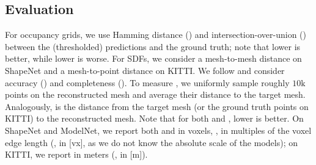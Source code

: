 \subsection{Evaluation}
\label{sec:evaluation}

For occupancy grids, we use Hamming distance (\Abs) and intersection-over-union (\IoU) between the (thresholded) predictions and the ground truth; note that lower \Abs is better, while lower \IoU is worse. For SDFs, we consider a mesh-to-mesh distance on ShapeNet and a mesh-to-point distance on KITTI. We follow \citep{Jensen2014CVPR} and consider accuracy (\Acc) and completeness (\Compl). To measure \Acc, we uniformly sample roughly $10\text{k}$  points on the reconstructed mesh and average their distance to the target mesh. Analogously, \Compl is the distance from the target mesh (or the ground truth points on KITTI) to the reconstructed mesh. Note that for both \Acc and \Compl, lower is better. On ShapeNet and ModelNet, we report both \Acc and \Compl in voxels, \ie, in multiples of the voxel edge length (\ie, in [vx], as we do not know the absolute scale of the models); on KITTI, we report \Compl in meters (\ie, in [m]).